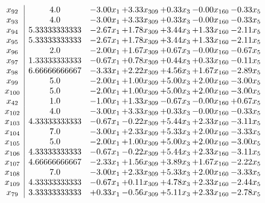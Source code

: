 \documentclass[8pt]{article}
\begin{document}
\[\begin{array}{c| c c@{\hskip 2pt} c@{\hskip 2pt} c@{\hskip 2pt} c@{\hskip 2pt} c@{\hskip 2pt} }
 x_{92}   &  4.0 & -3.00 x_{1} & +  3.33 x_{309} & +  0.33 x_{3} & -0.00 x_{160} & -0.33 x_{5}\\
 x_{93}   &  4.0 & -3.00 x_{1} & +  3.33 x_{309} & +  0.33 x_{3} & -0.00 x_{160} & -0.33 x_{5}\\
 x_{94}   &  5.33333333333 & -2.67 x_{1} & +  1.78 x_{309} & +  3.44 x_{3} & +  1.33 x_{160} & -2.11 x_{5}\\
 x_{95}   &  5.33333333333 & -2.67 x_{1} & +  1.78 x_{309} & +  3.44 x_{3} & +  1.33 x_{160} & -2.11 x_{5}\\
 x_{96}   &  2.0 & -2.00 x_{1} & +  1.67 x_{309} & +  0.67 x_{3} & -0.00 x_{160} & -0.67 x_{5}\\
 x_{97}   &  1.33333333333 & -0.67 x_{1} & +  0.78 x_{309} & +  0.44 x_{3} & +  0.33 x_{160} & -0.11 x_{5}\\
 x_{98}   &  6.66666666667 & -3.33 x_{1} & +  2.22 x_{309} & +  4.56 x_{3} & +  1.67 x_{160} & -2.89 x_{5}\\
 x_{99}   &  5.0 & -2.00 x_{1} & +  1.00 x_{309} & +  5.00 x_{3} & +  2.00 x_{160} & -3.00 x_{5}\\
 x_{100}   &  5.0 & -2.00 x_{1} & +  1.00 x_{309} & +  5.00 x_{3} & +  2.00 x_{160} & -3.00 x_{5}\\
 x_{42}   &  1.0 & -1.00 x_{1} & +  1.33 x_{309} & -0.67 x_{3} & -0.00 x_{160} & +  0.67 x_{5}\\
 x_{102}   &  4.0 & -3.00 x_{1} & +  3.33 x_{309} & +  0.33 x_{3} & -0.00 x_{160} & -0.33 x_{5}\\
 x_{103}   &  4.33333333333 & -0.67 x_{1} & -0.22 x_{309} & +  5.44 x_{3} & +  2.33 x_{160} & -3.11 x_{5}\\
 x_{104}   &  7.0 & -3.00 x_{1} & +  2.33 x_{309} & +  5.33 x_{3} & +  2.00 x_{160} & -3.33 x_{5}\\
 x_{105}   &  5.0 & -2.00 x_{1} & +  1.00 x_{309} & +  5.00 x_{3} & +  2.00 x_{160} & -3.00 x_{5}\\
 x_{106}   &  4.33333333333 & -0.67 x_{1} & -0.22 x_{309} & +  5.44 x_{3} & +  2.33 x_{160} & -3.11 x_{5}\\
 x_{107}   &  4.66666666667 & -2.33 x_{1} & +  1.56 x_{309} & +  3.89 x_{3} & +  1.67 x_{160} & -2.22 x_{5}\\
 x_{108}   &  7.0 & -3.00 x_{1} & +  2.33 x_{309} & +  5.33 x_{3} & +  2.00 x_{160} & -3.33 x_{5}\\
 x_{109}   &  4.33333333333 & -0.67 x_{1} & +  0.11 x_{309} & +  4.78 x_{3} & +  2.33 x_{160} & -2.44 x_{5}\\
 x_{79}   &  3.33333333333 & +  0.33 x_{1} & -0.56 x_{309} & +  5.11 x_{3} & +  2.33 x_{160} & -2.78 x_{5}\\

\end{array}\]
\end{document}
